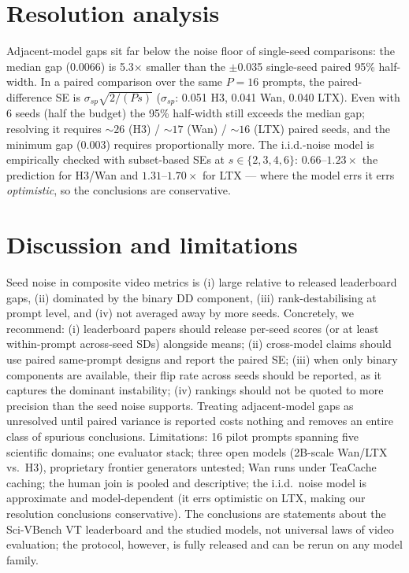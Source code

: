 \documentclass[conference]{IEEEtran}
\begin{document}
\section{Resolution analysis}
Adjacent-model gaps sit far below the noise floor of single-seed comparisons:
the median gap (0.0066) is 5.3$\times$ smaller than the $\pm$0.035 single-seed
paired 95\% half-width. In a paired comparison over the same $P{=}16$ prompts,
the paired-difference SE is $\sigma_{sp}\sqrt{2/(Ps)}$ ($\sigma_{sp}$: 0.051
H3, 0.041 Wan, 0.040 LTX). Even with 6 seeds (half the budget) the 95\% half-width still exceeds the
median gap; resolving it requires ${\sim}26$ (H3) / ${\sim}17$ (Wan) /
${\sim}16$ (LTX) paired seeds, and the minimum gap (0.003) requires
proportionally more. The i.i.d.-noise model is empirically checked with
subset-based SEs at $s{\in}\{2,3,4,6\}$: $0.66$--$1.23\times$ the prediction
for H3/Wan and $1.31$--$1.70\times$ for LTX --- where the model errs it errs
\emph{optimistic}, so the conclusions are conservative.

\section{Discussion and limitations}
Seed noise in composite video metrics is (i) large relative to released
leaderboard gaps, (ii) dominated by the binary DD component, (iii)
rank-destabilising at prompt level, and (iv) not averaged away by more seeds.
Concretely, we recommend: (i) leaderboard papers should release per-seed
scores (or at least within-prompt across-seed SDs) alongside means; (ii)
cross-model claims should use paired same-prompt designs and report the
paired SE; (iii) when only binary components are available, their flip rate
across seeds should be reported, as it captures the dominant instability;
(iv) rankings should not be quoted to more precision than the seed noise
supports. Treating adjacent-model gaps as unresolved until paired variance is
reported costs nothing and removes an entire class of spurious conclusions.
Limitations: 16 pilot prompts spanning five scientific domains; one evaluator
stack; three open models (2B-scale Wan/LTX vs.\ H3), proprietary frontier
generators untested; Wan runs under TeaCache caching; the human join is pooled
and descriptive; the i.i.d.\ noise model is approximate and model-dependent
(it errs optimistic on LTX, making our resolution conclusions conservative).
The conclusions are statements about the Sci-VBench VT leaderboard and the
studied models, not universal laws of video evaluation; the protocol, however,
is fully released and can be rerun on any model family.
\end{document}

